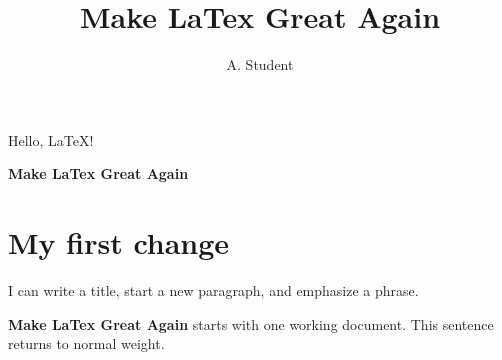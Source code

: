 \documentclass[11pt,a4paper]{article}
\title{Make LaTex Great Again}
\author{A. Student}
\date{}
\begin{document}
\maketitle
Hello, LaTeX!

\begin{center}
  {\LARGE\bfseries Make LaTex Great Again\par}
\end{center}

\section{My first change}
I can write a title, start a new paragraph, and emphasize a phrase.

\textbf{Make LaTex Great Again} starts with one working document.
This sentence returns to normal weight.
\end{document}
